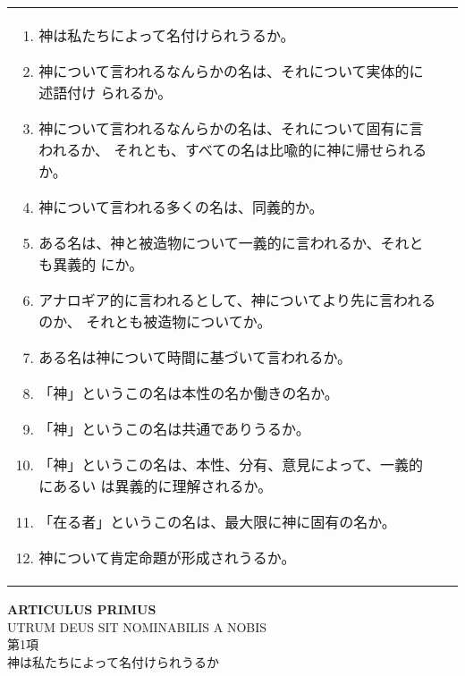 \documentclass[10pt]{jsarticle}
\begin{document}
\begin{longtable}{p{21em}p{21em}}
\vspace{1.3em}
\begin{enumerate}
 \item 神は私たちによって名付けられうるか。
 \item 神について言われるなんらかの名は、それについて実体的に述語付け
 られるか。
 \item 神について言われるなんらかの名は、それについて固有に言われるか、
       それとも、すべての名は比喩的に神に帰せられるか。
 \item 神について言われる多くの名は、同義的か。
 \item ある名は、神と被造物について一義的に言われるか、それとも異義的
 にか。
 \item アナロギア的に言われるとして、神についてより先に言われるのか、
 それとも被造物についてか。
 \item ある名は神について時間に基づいて言われるか。
 \item 「神」というこの名は本性の名か働きの名か。
 \item 「神」というこの名は共通でありうるか。
 \item 「神」というこの名は、本性、分有、意見によって、一義的にあるい
 は異義的に理解されるか。
 \item 「在る者」というこの名は、最大限に神に固有の名か。
 \item 神について肯定命題が形成されうるか。
\end{enumerate}
\end{longtable}

\newpage
{}
\begin{center}
{\Large {\bf ARTICULUS PRIMUS}\\
UTRUM DEUS SIT NOMINABILIS A NOBIS}\\
{\large 第1項\\神は私たちによって名付けられうるか}
\end{center}
\end{document}
